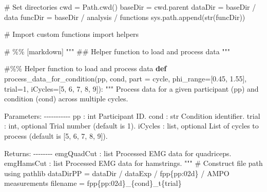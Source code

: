 \documentclass[
  11pt,
  a4paper]{article}
\newenvironment{Shaded}{\begin{snugshade}}{\end{snugshade}}
\newcommand{\BuiltInTok}[1]{\textcolor[rgb]{0.00,0.23,0.31}{#1}}
\newcommand{\CommentTok}[1]{\textcolor[rgb]{0.37,0.37,0.37}{#1}}
\newcommand{\DecValTok}[1]{\textcolor[rgb]{0.68,0.00,0.00}{#1}}
\newcommand{\FloatTok}[1]{\textcolor[rgb]{0.68,0.00,0.00}{#1}}
\newcommand{\ImportTok}[1]{\textcolor[rgb]{0.00,0.46,0.62}{#1}}
\newcommand{\KeywordTok}[1]{\textcolor[rgb]{0.00,0.23,0.31}{\textbf{#1}}}
\newcommand{\NormalTok}[1]{\textcolor[rgb]{0.00,0.23,0.31}{#1}}
\newcommand{\OperatorTok}[1]{\textcolor[rgb]{0.37,0.37,0.37}{#1}}
\newcommand{\SpecialCharTok}[1]{\textcolor[rgb]{0.37,0.37,0.37}{#1}}
\newcommand{\SpecialStringTok}[1]{\textcolor[rgb]{0.13,0.47,0.30}{#1}}
\newcommand{\StringTok}[1]{\textcolor[rgb]{0.13,0.47,0.30}{#1}}
\begin{document}
\begin{Shaded}
\begin{Highlighting}[]
\CommentTok{\# Set directories}
\NormalTok{cwd }\OperatorTok{=}\NormalTok{ Path.cwd()}
\NormalTok{baseDir }\OperatorTok{=}\NormalTok{ cwd.parent}
\NormalTok{dataDir }\OperatorTok{=}\NormalTok{ baseDir }\OperatorTok{/} \StringTok{\textquotesingle{}data\textquotesingle{}}
\NormalTok{funcDir }\OperatorTok{=}\NormalTok{ baseDir }\OperatorTok{/} \StringTok{\textquotesingle{}analysis\textquotesingle{}} \OperatorTok{/} \StringTok{\textquotesingle{}functions\textquotesingle{}}
\NormalTok{sys.path.append(}\BuiltInTok{str}\NormalTok{(funcDir))}

\CommentTok{\# Import custom functions}
\ImportTok{import}\NormalTok{ helpers}

\CommentTok{\# \%\% [markdown]}
\CommentTok{"""}
\CommentTok{\#\# Helper function to load and process data}
\CommentTok{"""}

\CommentTok{\#\%\% Helper function to load and process data}
\KeywordTok{def}\NormalTok{ process\_data\_for\_condition(pp, cond, part }\OperatorTok{=} \StringTok{\textquotesingle{}cycle\textquotesingle{}}\NormalTok{, phi\_range}\OperatorTok{=}\NormalTok{[}\FloatTok{0.45}\NormalTok{, }\FloatTok{1.55}\NormalTok{], trial}\OperatorTok{=}\DecValTok{1}\NormalTok{, iCycles}\OperatorTok{=}\NormalTok{[}\DecValTok{5}\NormalTok{, }\DecValTok{6}\NormalTok{, }\DecValTok{7}\NormalTok{, }\DecValTok{8}\NormalTok{, }\DecValTok{9}\NormalTok{]):}
    \CommentTok{"""}
\CommentTok{    Process data for a given participant (pp) and condition (cond) across multiple cycles.}

\CommentTok{    Parameters:}
\CommentTok{    {-}{-}{-}{-}{-}{-}{-}{-}{-}{-}{-}}
\CommentTok{    pp : int}
\CommentTok{        Participant ID.}
\CommentTok{    cond : str}
\CommentTok{        Condition identifier.}
\CommentTok{    trial : int, optional}
\CommentTok{        Trial number (default is 1).}
\CommentTok{    iCycles : list, optional}
\CommentTok{        List of cycles to process (default is [5, 6, 7, 8, 9]).}

\CommentTok{    Returns:}
\CommentTok{    {-}{-}{-}{-}{-}{-}{-}{-}}
\CommentTok{    emgQuadCut : list}
\CommentTok{        Processed EMG data for quadriceps.}
\CommentTok{    emgHamsCut : list}
\CommentTok{        Processed EMG data for hamstrings.}
\CommentTok{    """}
    \CommentTok{\# Construct file path using pathlib}
\NormalTok{    dataDirPP }\OperatorTok{=}\NormalTok{ dataDir }\OperatorTok{/} \StringTok{\textquotesingle{}dataExp\textquotesingle{}} \OperatorTok{/} \SpecialStringTok{f\textquotesingle{}pp}\SpecialCharTok{\{}\NormalTok{pp}\SpecialCharTok{:02d\}}\SpecialStringTok{\textquotesingle{}} \OperatorTok{/} \StringTok{\textquotesingle{}AMPO measurements\textquotesingle{}}
\NormalTok{    filename }\OperatorTok{=} \SpecialStringTok{f\textquotesingle{}pp}\SpecialCharTok{\{}\NormalTok{pp}\SpecialCharTok{:02d\}}\SpecialStringTok{\_}\SpecialCharTok{\{}\NormalTok{cond}\SpecialCharTok{\}}\SpecialStringTok{\_t}\SpecialCharTok{\{}\NormalTok{trial}\SpecialCharTok{\}}\SpecialStringTok{\textquotesingle{}}
    

\end{Highlighting}
\end{Shaded}
\end{document}
